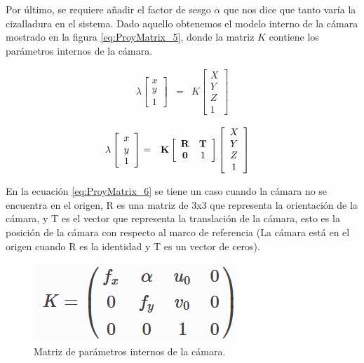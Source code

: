 Por último, se requiere añadir el factor de sesgo $\alpha$ que nos dice que tanto varía la cizalladura en el sistema. Dado aquello obtenemos el modelo interno de la cámara mostrado en la figura \ref{eq:ProyMatrix_5}, donde la matriz $K$ contiene los parámetros internos de la cámara.


\begin{equation}
\begin{aligned}
\lambda\left[\begin{array}{cc}x\\y\\1\end{array}\right]
 & = & K
\left[\begin{array}{c}X\\Y\\Z\\1\end{array}\right]
\end{aligned}
\label{eq:ProyMatrix_5}
\end{equation}  
 
\begin{equation}
\begin{aligned}
\lambda\left[\begin{array}{cc}x\\y\\1\end{array}\right]
 & = & \mathbf{K} &\left[\begin{array}{cc} \mathbf{R} & \mathbf{T}\\\mathbf{0} & 1\end{array}\right]
\left[\begin{array}{c}X\\Y\\Z\\1\end{array}\right]
\end{aligned}
\label{eq:ProyMatrix_6}
\end{equation}  

En la ecuación \ref{eq:ProyMatrix_6} se tiene un caso cuando la cámara no se encuentra en el origen, R es una matriz de 3x3 que representa la orientación de la cámara, y T es el vector que representa la translación de la cámara, esto es la posición de la cámara con respecto al marco de referencia (La cámara está en el origen cuando R es la identidad y T es un vector de ceros).

 \begin{figure}[h]
\centering
\includegraphics[scale=0.7]{GraficosEdArt/pinholeHomogenea_6.PNG}
\caption{Matriz de parámetros internos de la cámara.}
\label{kmatrix}
\end{figure}  
 
